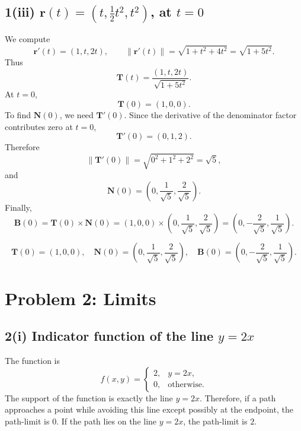 \documentclass[11pt]{article}
\newcommand{\norm}[1]{\left\lVert #1 \right\rVert}
\begin{document}
\subsection{1(iii) \(\mathbf r(t)=\left(t,\frac12t^2,t^2\right)\), at \(t=0\)}

We compute
\[
\mathbf r'(t)=(1,t,2t),
\qquad
\norm{\mathbf r'(t)}=\sqrt{1+t^2+4t^2}=\sqrt{1+5t^2}.
\]
Thus
\[
\mathbf T(t)=\frac{(1,t,2t)}{\sqrt{1+5t^2}}.
\]
At \(t=0\),
\[
\mathbf T(0)=(1,0,0).
\]
To find \(\mathbf N(0)\), we need \(\mathbf T'(0)\). Since the derivative of the denominator factor contributes zero at \(t=0\),
\[
\mathbf T'(0)=(0,1,2).
\]
Therefore
\[
\norm{\mathbf T'(0)}=\sqrt{0^2+1^2+2^2}=\sqrt5,
\]
and
\[
\mathbf N(0)=\left(0,\frac1{\sqrt5},\frac2{\sqrt5}\right).
\]
Finally,
\[
\mathbf B(0)=\mathbf T(0)\times \mathbf N(0)
=(1,0,0)\times\left(0,\frac1{\sqrt5},\frac2{\sqrt5}\right)
=\left(0,-\frac2{\sqrt5},\frac1{\sqrt5}\right).
\]

\begin{answerbox}
\[
\boxed{\mathbf T(0)=(1,0,0),\quad
\mathbf N(0)=\left(0,\frac1{\sqrt5},\frac2{\sqrt5}\right),\quad
\mathbf B(0)=\left(0,-\frac2{\sqrt5},\frac1{\sqrt5}\right).}
\]
\end{answerbox}

\newpage
\section{Problem 2: Limits}

\subsection{2(i) Indicator function of the line \(y=2x\)}

The function is
\[
f(x,y)=
\begin{cases}
2,& y=2x,\\
0,& \text{otherwise.}
\end{cases}
\]
The support of the function is exactly the line \(y=2x\). Therefore, if a path approaches a point while avoiding this line except possibly at the endpoint, the path-limit is \(0\). If the path lies on the line \(y=2x\), the path-limit is \(2\).
\end{document}
